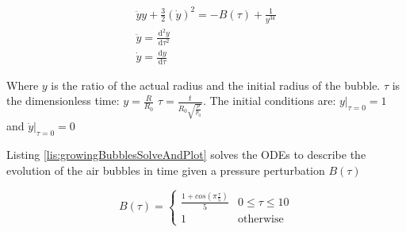 \documentclass{article}
\newcommand{\ud}{\,\mathrm{d}}
\begin{document}
\begin{equation}
\begin{aligned}
\ddot{y} y + \frac{3}{2} \left( \dot{y} \right)^2 = -B(\tau) + \frac{1}{y^{3 k}}\\
\ddot{y} = \frac{\ud^2 y}{\ud \tau^2}\\
\dot{y} = \frac{\ud y}{\ud \tau}
\end{aligned}
\label{eq:bubbleRadius}
\end{equation}

Where $y$ is the ratio of the actual radius and the initial radius of the bubble. $\tau$ is the dimensionless time: $\displaystyle y = \frac{R}{R_0} $ $\displaystyle \tau = \frac{t}{R_0 \sqrt{\frac{\rho}{p_0}}}$. The initial conditions are: $\displaystyle y \rvert_{\tau = 0} = 1$ and $\displaystyle \dot{y} \rvert_{\tau = 0} = 0$

Listing \ref{lis:growingBubblesSolveAndPlot} solves the ODEs to describe the evolution of the air bubbles in time given a pressure perturbation $B(\tau)$

$$
B(\tau) =
    \begin{cases}
      \frac{1 + cos\left( \pi \frac{\tau}{5} \right)}{5} & 0 \leq \tau \leq 10\\
      1 & \text{otherwise}
    \end{cases}
$$
\end{document}
